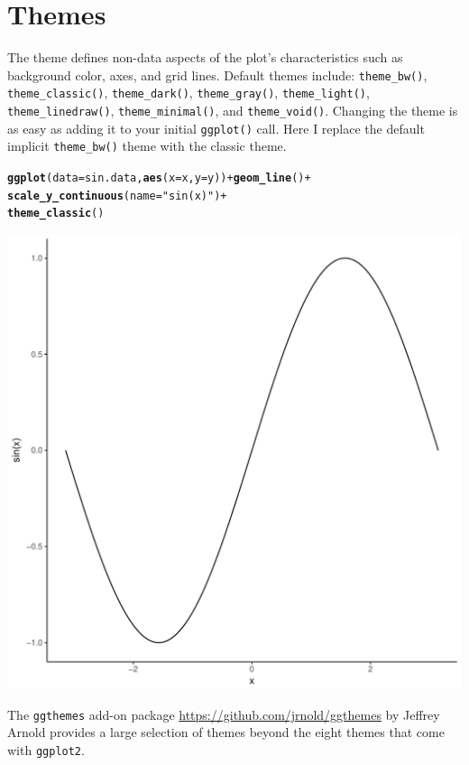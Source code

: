 \documentclass[12pt,oneside]{book}\usepackage[]{graphicx}\usepackage[]{color}
\makeatletter
\def\maxwidth{ %
  \ifdim\Gin@nat@width>\linewidth
    \linewidth
  \else
    \Gin@nat@width
  \fi
}
\newcommand{\hlstr}[1]{\textcolor[rgb]{0.192,0.494,0.8}{#1}}%
\newcommand{\hlopt}[1]{\textcolor[rgb]{0,0,0}{#1}}%
\newcommand{\hlstd}[1]{\textcolor[rgb]{0.345,0.345,0.345}{#1}}%
\newcommand{\hlkwc}[1]{\textcolor[rgb]{0.333,0.667,0.333}{#1}}%
\newcommand{\hlkwd}[1]{\textcolor[rgb]{0.737,0.353,0.396}{\textbf{#1}}}%
\newenvironment{kframe}{%
 \def\at@end@of@kframe{}%
 \ifinner\ifhmode%
  \def\at@end@of@kframe{\end{minipage}}%
  \begin{minipage}{\columnwidth}%
 \fi\fi%
 \def\FrameCommand##1{\hskip\@totalleftmargin \hskip-\fboxsep
 \colorbox{shadecolor}{##1}\hskip-\fboxsep
     \hskip-\linewidth \hskip-\@totalleftmargin \hskip\columnwidth}%
 \MakeFramed {\advance\hsize-\width
   \@totalleftmargin\z@ \linewidth\hsize
   \@setminipage}}%
 {\par\unskip\endMakeFramed%
 \at@end@of@kframe}
\newenvironment{knitrout}{}{} %
\makeatother
\begin{document}
\section{Themes}
The theme defines non-data aspects of the plot's characteristics such as background color, axes, and grid lines. Default themes include: \verb+theme_bw()+, \verb+theme_classic()+, \verb+theme_dark()+, \verb+theme_gray()+, \verb+theme_light()+, \verb+theme_linedraw()+, \verb+theme_minimal()+, and \verb+theme_void()+. Changing the theme is as easy as adding it to your initial \verb+ggplot()+ call. Here I replace the default implicit \verb+theme_bw()+ theme with the classic theme.
\begin{knitrout}
\color{fgcolor}\begin{kframe}
\begin{alltt}
\hlkwd{ggplot}\hlstd{(}\hlkwc{data} \hlstd{= sin.data,} \hlkwd{aes}\hlstd{(}\hlkwc{x} \hlstd{= x,} \hlkwc{y} \hlstd{= y))} \hlopt{+} \hlkwd{geom_line}\hlstd{()} \hlopt{+}
    \hlkwd{scale_y_continuous}\hlstd{(}\hlkwc{name} \hlstd{=} \hlstr{"sin(x)"}\hlstd{)} \hlopt{+}
    \hlkwd{theme_classic}\hlstd{()}
\end{alltt}
\end{kframe}
\includegraphics[width=\maxwidth]{figure/unnamed-chunk-84-1} 

\end{knitrout}
The \verb+ggthemes+ add-on package \url{https://github.com/jrnold/ggthemes} by Jeffrey Arnold provides a large selection of themes beyond the eight themes that come with \verb+ggplot2+.
\end{document}
